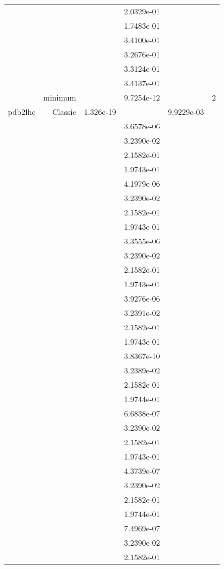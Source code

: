 \begin{xltabular}{\textwidth}{r|rS[table-format=1.3e+2]S[table-format=1.4e+2]S[table-format=1.4e+2]S[table-format=-1.5]}
&  &  & 2.0329e-01 & & \\
&  &  & 1.7483e-01 & & \\
&  &  & 3.4100e-01 & & \\
&  &  & 3.2676e-01 & & \\
&  &  & 3.3124e-01 & & \\
&  &  & 3.4137e-01 & & \\
& minimum &  & 9.7254e-12 & & 2 \\  \addlinespace
pdb2lhc & Classic & 1.326e-19 &  & 9.9229e-03 & \\
&  &  & 3.6578e-06 & & \\
&  &  & 3.2390e-02 & & \\
&  &  & 2.1582e-01 & & \\
&  &  & 1.9743e-01 & & \\
&  &  & 4.1979e-06 & & \\
&  &  & 3.2390e-02 & & \\
&  &  & 2.1582e-01 & & \\
&  &  & 1.9743e-01 & & \\
&  &  & 3.3555e-06 & & \\
&  &  & 3.2390e-02 & & \\
&  &  & 2.1582e-01 & & \\
&  &  & 1.9743e-01 & & \\
&  &  & 3.9276e-06 & & \\
&  &  & 3.2391e-02 & & \\
&  &  & 2.1582e-01 & & \\
&  &  & 1.9743e-01 & & \\
&  &  & 3.8367e-10 & & \\
&  &  & 3.2389e-02 & & \\
&  &  & 2.1582e-01 & & \\
&  &  & 1.9744e-01 & & \\
&  &  & 6.6838e-07 & & \\
&  &  & 3.2390e-02 & & \\
&  &  & 2.1582e-01 & & \\
&  &  & 1.9743e-01 & & \\
&  &  & 4.3739e-07 & & \\
&  &  & 3.2390e-02 & & \\
&  &  & 2.1582e-01 & & \\
&  &  & 1.9744e-01 & & \\
&  &  & 7.4969e-07 & & \\
&  &  & 3.2390e-02 & & \\
&  &  & 2.1582e-01 & & \\

\end{xltabular}
